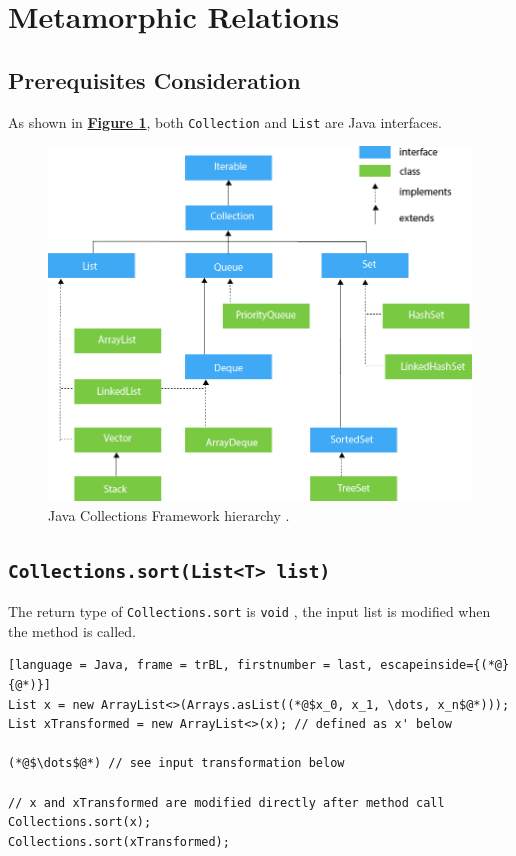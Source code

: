 \documentclass[12pt, a4paper]{article}
\begin{document}
\section{Metamorphic Relations}
\subsection{Prerequisites Consideration}
As shown in \hyperref[figure:collection_hierarchy]{\textbf{Figure
\ref*{figure:collection_hierarchy}}}, both \texttt{Collection} and \texttt{List} are Java
interfaces.

\begin{figure}[H]
  \centering
  \includegraphics[width=.75\textwidth]{images/java-collection-hierarchy.png}
  \caption{Java Collections Framework hierarchy \cite{java_collection_hierarchy}.}
  \label{figure:collection_hierarchy}
\end{figure}


\subsection{\texttt{Collections.sort(List<T> list)}}
The return type of \texttt{Collections.sort} is \texttt{void} \cite{collection_sort}, the input list
is modified when the method is called.
\begin{lstlisting}[language = Java, frame = trBL, firstnumber = last, escapeinside={(*@}{@*)}]
List x = new ArrayList<>(Arrays.asList((*@$x_0, x_1, \dots, x_n$@*)));
List xTransformed = new ArrayList<>(x); // defined as x' below

(*@$\dots$@*) // see input transformation below

// x and xTransformed are modified directly after method call
Collections.sort(x);
Collections.sort(xTransformed);
\end{lstlisting}
\end{document}
